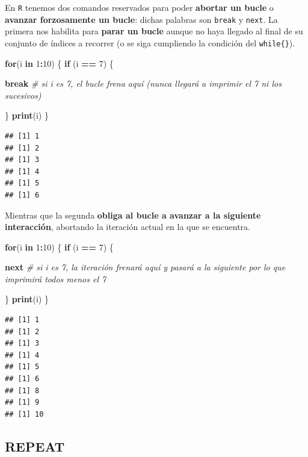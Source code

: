 \documentclass[11pt,]{book}
\newenvironment{Shaded}{\begin{snugshade}}{\end{snugshade}}
\newcommand{\CommentTok}[1]{\textcolor[rgb]{0.37,0.37,0.37}{\textit{#1}}}
\newcommand{\ControlFlowTok}[1]{\textcolor[rgb]{0.27,0.27,0.27}{\textbf{#1}}}
\newcommand{\DecValTok}[1]{\textcolor[rgb]{0.06,0.06,0.06}{#1}}
\newcommand{\KeywordTok}[1]{\textcolor[rgb]{0.27,0.27,0.27}{\textbf{#1}}}
\newcommand{\NormalTok}[1]{#1}
\newcommand{\OperatorTok}[1]{\textcolor[rgb]{0.43,0.43,0.43}{\textbf{#1}}}
\newcommand{\StringTok}[1]{\textcolor[rgb]{0.5,0.5,0.5}{#1}}
\begin{document}
En \texttt{R} tenemos dos comandos reservados para poder \textbf{abortar un bucle} o \textbf{avanzar forzosamente un bucle}: dichas palabras son \texttt{break} y \texttt{next}. La primera nos habilita para \textbf{parar un bucle} aunque no haya llegado al final de su conjunto de índices a recorrer (o se siga cumpliendo la condición del \texttt{while\{\}}).

\begin{Shaded}
\begin{Highlighting}[]
\ControlFlowTok{for}\NormalTok{(i }\ControlFlowTok{in} \DecValTok{1}\OperatorTok{:}\DecValTok{10}\NormalTok{) \{}
  \ControlFlowTok{if}\NormalTok{ (i }\OperatorTok{==}\StringTok{ }\DecValTok{7}\NormalTok{) \{}
    
    \ControlFlowTok{break} \CommentTok{# si i es 7, el bucle frena aquí (nunca llegará a imprimir el 7 ni los sucesivos)}
    
\NormalTok{  \}}
  \KeywordTok{print}\NormalTok{(i)}
\NormalTok{\}}
\end{Highlighting}
\end{Shaded}

\begin{verbatim}
## [1] 1
## [1] 2
## [1] 3
## [1] 4
## [1] 5
## [1] 6
\end{verbatim}

Mientras que la segunda \textbf{obliga al bucle a avanzar a la siguiente interacción}, abortando la iteración actual en la que se encuentra.

\begin{Shaded}
\begin{Highlighting}[]
\ControlFlowTok{for}\NormalTok{(i }\ControlFlowTok{in} \DecValTok{1}\OperatorTok{:}\DecValTok{10}\NormalTok{) \{}
  \ControlFlowTok{if}\NormalTok{ (i }\OperatorTok{==}\StringTok{ }\DecValTok{7}\NormalTok{) \{}
    
    \ControlFlowTok{next} \CommentTok{# si i es 7, la iteración frenará aquí y pasará a la siguiente por lo que imprimirá todos menos el 7}
    
\NormalTok{  \}}
  \KeywordTok{print}\NormalTok{(i)}
\NormalTok{\}}
\end{Highlighting}
\end{Shaded}

\begin{verbatim}
## [1] 1
## [1] 2
## [1] 3
## [1] 4
## [1] 5
## [1] 6
## [1] 8
## [1] 9
## [1] 10
\end{verbatim}

\hypertarget{repeat}{%
\subsection{REPEAT}\label{repeat}}
\end{document}
